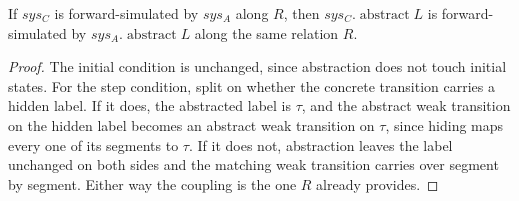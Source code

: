 \begin{theorem}
  \label{thm:precong-abstract}
  \leanok
  If $sys_C$ is forward-simulated by $sys_A$ along $R$, then $sys_C.\operatorname{abstract} L$ is forward-simulated by $sys_A.\operatorname{abstract} L$ along the same relation $R$.
\end{theorem}

\begin{proof}\leanok
  The initial condition is unchanged, since abstraction does not touch initial states.
  For the step condition, split on whether the concrete transition carries a hidden label.
  If it does, the abstracted label is $\tau$, and the abstract weak transition on the hidden label becomes an abstract weak transition on $\tau$, since hiding maps every one of its segments to $\tau$.
  If it does not, abstraction leaves the label unchanged on both sides and the matching weak transition carries over segment by segment.
  Either way the coupling is the one $R$ already provides.
\end{proof}
